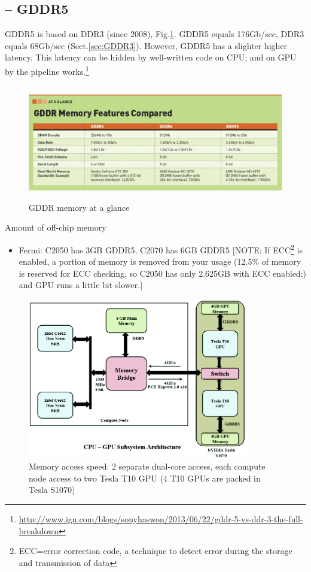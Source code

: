 \subsection{-- GDDR5}
\label{sec:GDDR5}

GDDR5 is based on DDR3 (since 2008), Fig.\ref{fig:GDDR_mem}. GDDR5 equals
176Gb/sec, DDR3 equals 68Gb/sec (Sect.\ref{sec:GDDR3}).
However, GDDR5 has a slighter higher latency. This latency can be hidden by
well-written code on CPU; and on GPU by the pipeline
works.\footnote{\url{http://www.ign.com/blogs/sonyhaswon/2013/06/22/gddr-5-vs-ddr-3-the-full-breakdown}}

\begin{figure}[hbt]
  \centerline{\includegraphics[height=5cm,
    angle=0]{./images/GDDR_mem.eps}}
  \caption{GDDR memory at a glance}
  \label{fig:GDDR_mem}
\end{figure}


Amount of off-chip memory
  \begin{itemize}

  \item Fermi: C2050 has 3GB GDDR5, C2070 has 6GB GDDR5 [NOTE: If
    ECC\footnote{ECC=error correction code, a technique to detect
      error during the storage and transmission of data}
    is enabled, a portion of memory is removed from your usage (12.5\%
    of memory is reserved for ECC checking, so C2050 has only 2.625GB with ECC
    enabled;) and GPU runs a little bit slower.]
  \end{itemize}

  \begin{figure}[hbt]
    \centerline{\includegraphics[height=7cm,
      angle=0]{./images/tesla_connect.eps}}
    \caption{Memory access speed: 2 separate dual-core access, each
      compute node access to two Tesla T10 GPU (4 T10 GPUs are packed
      in Tesla S1070)}
    \label{fig:tesla_singlenode}
  \end{figure}

